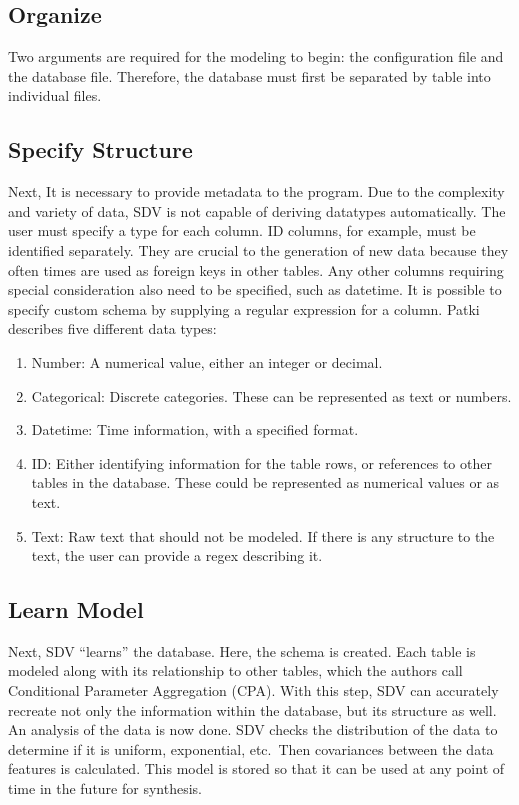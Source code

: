 \subsection{Organize}

Two arguments are required for the modeling to begin: the configuration file
and the database file. Therefore, the database must first be separated by
table into individual files.\cite{patki-wedge-veer-sdv}

\subsection{Specify Structure}

Next, It is necessary to provide metadata to the program. Due to the
complexity and variety of data, SDV is not capable of deriving datatypes
automatically. The user must specify a type for each column. ID columns, for
example, must be identified separately. They are crucial to the generation
of new data because they often times are used as foreign keys in other
tables. Any other columns requiring special consideration also need to be
specified, such as datetime. It is possible to specify custom schema by
supplying a regular expression for a column. Patki describes five different
data types\cite{patki-wedge-veer-sdv}:
\begin{enumerate}
    \item Number: A numerical value, either an integer or decimal.
    \item Categorical: Discrete categories. These can be represented as text
    or numbers.
    \item Datetime: Time information, with a specified format.
    \item ID: Either identifying information for the table rows, or references
    to other
tables in the database. These could be represented as numerical values or as
text.
    \item Text: Raw text that should not be modeled. If there is any structure
    to the
text, the user can provide a regex describing it.
\end{enumerate}

\subsection{Learn Model}

Next, SDV ``learns'' the database. Here, the schema is created. Each table is
modeled along with its relationship to other tables, which the authors call
Conditional Parameter Aggregation (CPA). With this step, SDV can accurately
recreate not only the information within the database, but its structure as
well. An analysis of the data is now done. SDV checks the distribution of the
data to determine if it is uniform, exponential, etc.\ Then covariances between
the data features is calculated. This model is stored so that it can be used
at any point of time in the future for synthesis.\cite{patki-wedge-veer-sdv}

